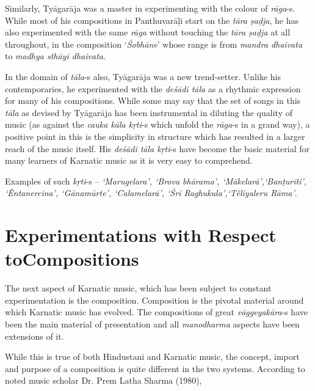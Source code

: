 Similarly, Tyāgarāja was a master in experimenting with the colour of \textit{rāga}-s. While most of his compositions in Panthuvarāḷi start on the \textit{tāra ṣaḍja}, he has also experimented with the same \textit{rāga} without touching the \textit{tāra ṣaḍja} at all throughout, in the composition ‘\textit{Śobhāne}’ whose range is from \textit{mandra dhaivata} to \textit{madhya sthāyi dhaivata}.

In the domain of \textit{tāla}-s also, Tyāgarāja was a new trend-setter. Unlike his contemporaries, he experimented with the \textit{deśādi tāla} as a rhythmic expression for many of his compositions. While some may say that the set of songs in this \textit{tāla} as devised by Tyāgarāja has been instrumental in diluting the quality of music (as against the \textit{cauka kāla kṛti}-s which unfold the \textit{rāga}-s in a grand way), a positive point in this is the simplicity in structure which has resulted in a larger reach of the music itself. His \textit{deśādi tāla kṛti}-s have become the basic material for many learners of Karnatic music as it is very easy to comprehend.

Examples of such \textit{kṛti}-s – \textit{‘Marugelara’, ‘Brova bhārama’, ‘Mākelarā’,\break ‘Banṭurīti’, ‘Êntanercina’, ‘Gānamūrte’, ‘Calamelarā’, ‘Śrī Raghukula’,\break ‘Têliyaleru Rāma’}.

\newpage

\section*{Experimentations with Respect to\hfill \break Compositions}

The next aspect of Karnatic music, which has been subject to constant experimentation is the composition. Composition is the pivotal material around which Karnatic music has evolved. The compositions of great \textit{vāggeyakāra}-s have been the main material of presentation and all \textit{manodharma} aspects have been extensions of it.

While this is true of both Hindustani and Karnatic music, the concept, import and purpose of a composition is quite different in the two systems. According to noted music scholar Dr. Prem Latha Sharma (1980),


